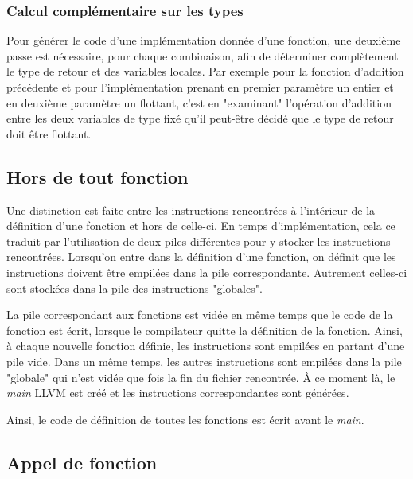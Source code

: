 \documentclass[12pt]{article}
\begin{document}
\subsubsection{Calcul complémentaire sur les types}

Pour générer le code d'une implémentation donnée d'une fonction, une deuxième passe est nécessaire, pour chaque combinaison, afin de déterminer complètement le type de retour et des variables locales. Par exemple pour la fonction d'addition précédente et pour l'implémentation prenant en premier paramètre un entier et en deuxième paramètre un flottant, c'est en "examinant" l'opération d'addition entre les deux variables de type fixé qu'il peut-être décidé que le type de retour doit être flottant.

\subsection{Hors de tout fonction}

Une distinction est faite entre les instructions rencontrées à l'intérieur de la définition d'une fonction et hors de celle-ci. En temps d'implémentation, cela ce traduit par l'utilisation de deux piles différentes pour y stocker les instructions rencontrées. Lorsqu'on entre dans la définition d'une fonction, on définit que les instructions doivent être empilées dans la pile correspondante. Autrement celles-ci sont stockées dans la pile des instructions "globales".

La pile correspondant aux fonctions est vidée en même temps que le code de la fonction est écrit, lorsque le compilateur quitte la définition de la fonction. Ainsi, à chaque nouvelle fonction définie, les instructions sont empilées en partant d'une pile vide. Dans un même temps, les autres instructions sont empilées dans la pile "globale" qui n'est vidée que fois la fin du fichier rencontrée.
À ce moment là, le \emph{main} LLVM est créé et les instructions correspondantes sont générées.

Ainsi, le code de définition de toutes les fonctions est écrit avant le \emph{main}.

\subsection{Appel de fonction}
\end{document}
